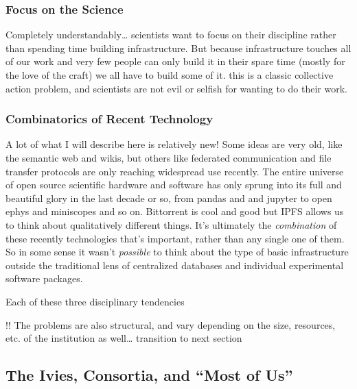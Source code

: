 \documentclass{article}
\begin{document}
\hypertarget{focus-on-the-science}{%
\subsubsection{Focus on the Science}\label{focus-on-the-science}}

Completely understandably\ldots{} scientists want to focus on their
discipline rather than spending time building infrastructure. But
because infrastructure touches all of our work and very few people can
only build it in their spare time (mostly for the love of the craft) we
all have to build some of it. this is a classic collective action
problem, and scientists are not evil or selfish for wanting to do their
work.

\hypertarget{combinatorics-of-recent-technology}{%
\subsubsection{Combinatorics of Recent
Technology}\label{combinatorics-of-recent-technology}}

A lot of what I will describe here is relatively new! Some ideas are
very old, like the semantic web and wikis, but others like federated
communication and file transfer protocols are only reaching widespread
use recently. The entire universe of open source scientific hardware and
software has only sprung into its full and beautiful glory in the last
decade or so, from pandas and and jupyter to open ephys and miniscopes
and so on. Bittorrent is cool and good but IPFS allows us to think about
qualitatively different things. It's ultimately the \emph{combination}
of these recently technologies that's important, rather than any single
one of them. So in some sense it wasn't \emph{possible} to think about
the type of basic infrastructure outside the traditional lens of
centralized databases and individual experimental software packages.

Each of these three disciplinary tendencies

!! The problems are also structural, and vary depending on the size,
resources, etc. of the institution as well\ldots{} transition to next
section

\hypertarget{the-ivies-consortia-and-most-of-us}{%
\subsection{The Ivies, Consortia, and ``Most of
Us''}\label{the-ivies-consortia-and-most-of-us}}
\end{document}
